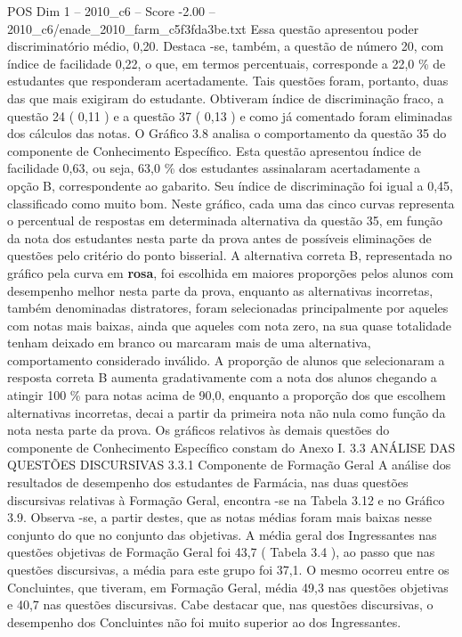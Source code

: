 \begin{textsample}{POS Dim 1 – 2010\_c6 – Score -2.00 – 2010\_c6/enade\_2010\_farm\_c5f3fda3be.txt}
Essa questão apresentou poder discriminatório médio, 0,20.
Destaca -se, também, a questão de número 20, com índice de facilidade 0,22, o que, em termos percentuais, corresponde a 22,0 \% de estudantes que responderam acertadamente.
Tais questões foram, portanto, duas das que mais exigiram do estudante.
Obtiveram índice de discriminação fraco, a questão 24 ( 0,11 ) e a questão 37 ( 0,13 ) e como já comentado foram eliminadas dos cálculos das notas.
O Gráfico 3.8 analisa o comportamento da questão 35 do componente de Conhecimento Específico.
Esta questão apresentou índice de facilidade 0,63, ou seja, 63,0 \% dos estudantes assinalaram acertadamente a opção B, correspondente ao gabarito.
Seu índice de discriminação foi igual a 0,45, classificado como muito bom.
Neste gráfico, cada uma das cinco curvas representa o percentual de respostas em determinada alternativa da questão 35, em função da nota dos estudantes nesta parte da prova antes de possíveis eliminações de questões pelo critério do ponto bisserial.
A alternativa correta B, representada no gráfico pela curva em \textbf{rosa}, foi escolhida em maiores proporções pelos alunos com desempenho melhor nesta parte da prova, enquanto as alternativas incorretas, também denominadas distratores, foram selecionadas principalmente por aqueles com notas mais baixas, ainda que aqueles com nota zero, na sua quase totalidade tenham deixado em branco ou marcaram mais de uma alternativa, comportamento considerado inválido.
A proporção de alunos que selecionaram a resposta correta B aumenta gradativamente com a nota dos alunos chegando a atingir 100 \% para notas acima de 90,0, enquanto a proporção dos que escolhem alternativas incorretas, decai a partir da primeira nota não nula como função da nota nesta parte da prova.
Os gráficos relativos às demais questões do componente de Conhecimento Específico constam do Anexo I. 3.3 ANÁLISE DAS QUESTÕES DISCURSIVAS 3.3.1 Componente de Formação Geral A análise dos resultados de desempenho dos estudantes de Farmácia, nas duas questões discursivas relativas à Formação Geral, encontra -se na Tabela 3.12 e no Gráfico 3.9.
Observa -se, a partir destes, que as notas médias foram mais baixas nesse conjunto do que no conjunto das objetivas.
A média geral dos Ingressantes nas questões objetivas de Formação Geral foi 43,7 ( Tabela 3.4 ), ao passo que nas questões discursivas, a média para este grupo foi 37,1.
O mesmo ocorreu entre os Concluintes, que tiveram, em Formação Geral, média 49,3 nas questões objetivas e 40,7 nas questões discursivas.
Cabe destacar que, nas questões discursivas, o desempenho dos Concluintes não foi muito superior ao dos Ingressantes.

\end{textsample}
